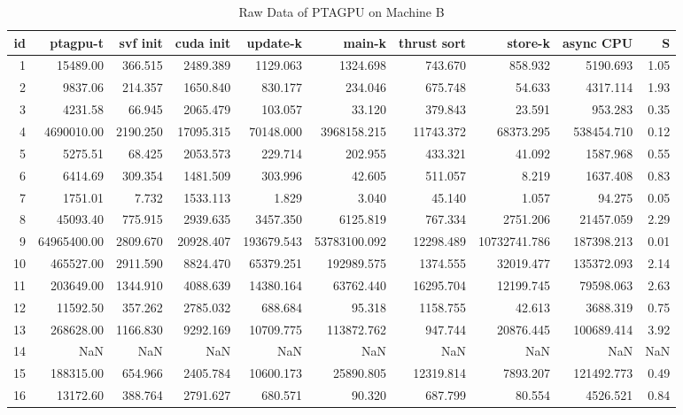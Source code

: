 \begin{table}[ht]
    \tiny
    \begin{tabular}{rrrrrrrrrr}
        \toprule
        id & ptagpu-t    & svf init & cuda init & update-k   & main-k       & thrust sort & store-k      & async CPU  & S    \\
        \midrule
        1  & 15489.00    & 366.515  & 2489.389  & 1129.063   & 1324.698     & 743.670     & 858.932      & 5190.693   & 1.05 \\
        2  & 9837.06     & 214.357  & 1650.840  & 830.177    & 234.046      & 675.748     & 54.633       & 4317.114   & 1.93 \\
        3  & 4231.58     & 66.945   & 2065.479  & 103.057    & 33.120       & 379.843     & 23.591       & 953.283    & 0.35 \\
        4  & 4690010.00  & 2190.250 & 17095.315 & 70148.000  & 3968158.215  & 11743.372   & 68373.295    & 538454.710 & 0.12 \\
        5  & 5275.51     & 68.425   & 2053.573  & 229.714    & 202.955      & 433.321     & 41.092       & 1587.968   & 0.55 \\
        6  & 6414.69     & 309.354  & 1481.509  & 303.996    & 42.605       & 511.057     & 8.219        & 1637.408   & 0.83 \\
        7  & 1751.01     & 7.732    & 1533.113  & 1.829      & 3.040        & 45.140      & 1.057        & 94.275     & 0.05 \\
        8  & 45093.40    & 775.915  & 2939.635  & 3457.350   & 6125.819     & 767.334     & 2751.206     & 21457.059  & 2.29 \\
        9  & 64965400.00 & 2809.670 & 20928.407 & 193679.543 & 53783100.092 & 12298.489   & 10732741.786 & 187398.213 & 0.01 \\
        10 & 465527.00   & 2911.590 & 8824.470  & 65379.251  & 192989.575   & 1374.555    & 32019.477    & 135372.093 & 2.14 \\
        11 & 203649.00   & 1344.910 & 4088.639  & 14380.164  & 63762.440    & 16295.704   & 12199.745    & 79598.063  & 2.63 \\
        12 & 11592.50    & 357.262  & 2785.032  & 688.684    & 95.318       & 1158.755    & 42.613       & 3688.319   & 0.75 \\
        13 & 268628.00   & 1166.830 & 9292.169  & 10709.775  & 113872.762   & 947.744     & 20876.445    & 100689.414 & 3.92 \\
        14 & NaN         & NaN      & NaN       & NaN        & NaN          & NaN         & NaN          & NaN        & NaN  \\
        15 & 188315.00   & 654.966  & 2405.784  & 10600.173  & 25890.805    & 12319.814   & 7893.207     & 121492.773 & 0.49 \\
        16 & 13172.60    & 388.764  & 2791.627  & 680.571    & 90.320       & 687.799     & 80.554       & 4526.521   & 0.84 \\
        \bottomrule
    \end{tabular}
    \caption{Raw Data of PTAGPU on Machine B}
\end{table}


